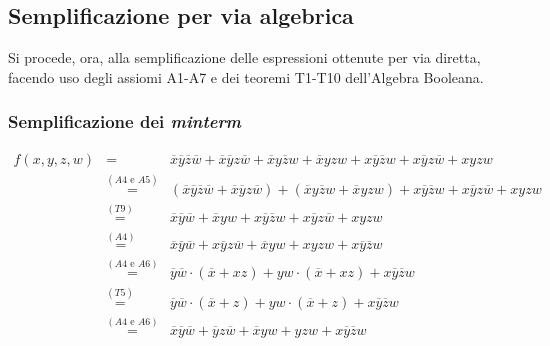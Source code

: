 \documentclass[a4paper]{extarticle}
\begin{document}
\vspace{1em}
\subsection{Semplificazione per via algebrica}
Si procede, ora, alla semplificazione delle espressioni ottenute per via diretta, facendo uso degli assiomi A1-A7 e dei teoremi T1-T10 dell’Algebra Booleana.

\vspace{1em}
\subsubsection{Semplificazione dei \emph{minterm}}
\begin{eqnarray*}
  f(x,y,z,w) &=& \overline{x}\overline{y}\overline{z}\overline{w} + \overline{x}\overline{y}z\overline{w} + \overline{x}y\overline{z}w + \overline{x}yzw + x\overline{y}\overline{z}w + x\overline{y}z\overline{w} + xyzw\\
  &\overset{\left(A4 \text{ e } A5\right)}{=}& \left(\overline{x}\overline{y}\overline{z}\overline{w} + \overline{x}\overline{y}z\overline{w}\right) + \left(\overline{x}y\overline{z}w + \overline{x}yzw\right) + x\overline{y}\overline{z}w + x\overline{y}z\overline{w} + xyzw\\
  &\overset{\left(T9\right)}{=}& \overline{x}\overline{y}\overline{w} + \overline{x}yw + x\overline{y}\overline{z}w + x\overline{y}z\overline{w} + xyzw\\
  &\overset{\left(A4\right)}{=}& \overline{x}\overline{y}\overline{w} + x\overline{y}z\overline{w} + \overline{x}yw + xyzw + x\overline{y}\overline{z}w\\
  &\overset{\left(A4 \text{ e } A6\right)}{=}& \overline{y}\overline{w} \cdot \left(\overline{x} + xz\right) + yw \cdot \left(\overline{x} + xz\right) + x\overline{y}\overline{z}w\\
  &\overset{\left(T5\right)}{=}& \overline{y}\overline{w} \cdot \left(\overline{x} + z\right) + yw \cdot \left(\overline{x} + z\right) + x\overline{y}\overline{z}w\\
  &\overset{\left(A4 \text{ e } A6\right)}{=}& \overline{x}\overline{y}\overline{w} + \overline{y}z\overline{w} + \overline{x}yw + yzw + x\overline{y}\overline{z}w\\
\end{eqnarray*}

\vspace{1em}
\end{document}
